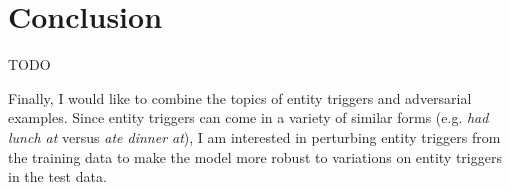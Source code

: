 \chapter{Conclusion}
TODO


Finally, I would like to combine the topics of entity triggers and adversarial examples. Since entity triggers can come in a  variety of similar forms (e.g. \textit{had lunch at} versus \textit{ate  dinner  at}), I am interested in perturbing entity triggers from the training data to make the model more robust to variations on entity triggers in the test data.
